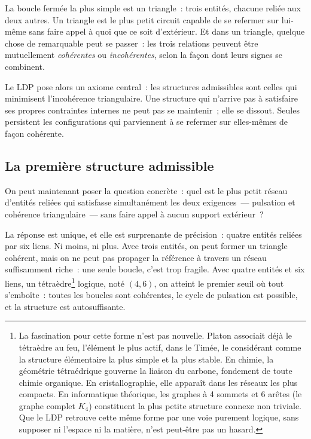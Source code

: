 \documentclass[12pt, a4paper, openright]{book}
\begin{document}
\medskip

La boucle fermée la plus simple est un triangle~: trois entités, chacune reliée aux deux autres. Un triangle est le plus petit circuit capable de se refermer sur lui-même sans faire appel à quoi que ce soit d'extérieur. Et dans un triangle, quelque chose de remarquable peut se passer~: les trois relations peuvent être mutuellement \emph{cohérentes} ou \emph{incohérentes}, selon la façon dont leurs signes se combinent.

\medskip

Le LDP pose alors un axiome central~: les structures admissibles sont celles qui minimisent l'incohérence triangulaire. Une structure qui n'arrive pas à satisfaire ses propres contraintes internes ne peut pas se maintenir~; elle se dissout. Seules persistent les configurations qui parviennent à se refermer sur elles-mêmes de façon cohérente.

\subsection*{La première structure admissible}

On peut maintenant poser la question concrète~: quel est le plus petit réseau d'entités reliées qui satisfasse simultanément les deux exigences~--- pulsation et cohérence triangulaire~--- sans faire appel à aucun support extérieur~?

\medskip

La réponse est unique, et elle est surprenante de précision~: quatre entités reliées par six liens. Ni moins, ni plus. Avec trois entités, on peut former un triangle cohérent, mais on ne peut pas propager la référence à travers un réseau suffisamment riche~: une seule boucle, c'est trop fragile. Avec quatre entités et six liens, un tétraèdre\footnote{La fascination pour cette forme n'est pas nouvelle. Platon associait déjà le tétraèdre au feu, l'élément le plus actif, dans le Timée, le considérant comme la structure élémentaire la plus simple et la plus stable. En chimie, la géométrie tétraédrique gouverne la liaison du carbone, fondement de toute chimie organique. En cristallographie, elle apparaît dans les réseaux les plus compacts. En informatique théorique, les graphes à 4 sommets et 6 arêtes (le graphe complet $K_4$) constituent la plus petite structure connexe non triviale. Que le LDP retrouve cette même forme par une voie purement logique, sans supposer ni l'espace ni la matière, n'est peut-être pas un hasard.} logique, noté $(4,6)$, on atteint le premier seuil où tout s'emboîte~: toutes les boucles sont cohérentes, le cycle de pulsation est possible, et la structure est autosuffisante.
\end{document}
